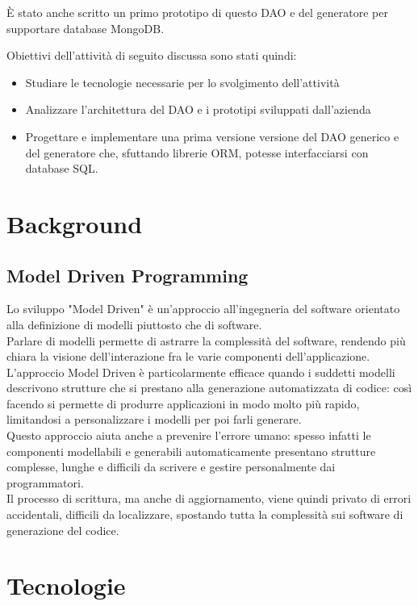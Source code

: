 \documentclass[a4paper, 12pt]{scrartcl}
\begin{document}
    È stato anche scritto un primo prototipo di questo DAO e del generatore per supportare database MongoDB.

    Obiettivi dell'attività di seguito discussa sono stati quindi:
    \begin{itemize}
        \item Studiare le tecnologie necessarie per lo svolgimento dell'attività
        \item Analizzare l'architettura del DAO e i prototipi sviluppati dall'azienda
        \item Progettare e implementare una prima versione versione del DAO generico e del generatore che, sfuttando librerie ORM, potesse interfacciarsi con database SQL.
    \end{itemize}
  \newpage

  \section*{Background}
    \subsection*{Model Driven Programming}
      Lo sviluppo "Model Driven" è un'approccio all'ingegneria del software orientato alla definizione di modelli piuttosto che di software.\\
      Parlare di modelli permette di astrarre la complessità del software, rendendo più chiara la visione dell'interazione fra le varie componenti dell'applicazione.\\
      L'approccio Model Driven è particolarmente efficace quando i suddetti modelli descrivono strutture che si prestano alla generazione automatizzata di codice: così facendo si permette di produrre applicazioni in modo molto più rapido, limitandosi a personalizzare
      i modelli per poi farli generare.\\
      Questo approccio aiuta anche a prevenire l'errore umano: spesso infatti le componenti modellabili e generabili automaticamente presentano strutture complesse, lunghe e difficili da scrivere e gestire personalmente dai programmatori.\\
      Il processo di scrittura, ma anche di aggiornamento, viene quindi privato di errori accidentali, difficili da localizzare, spostando tutta la complessità sui software di generazione del codice.\\
    \newpage

  \section*{Tecnologie}
\end{document}
